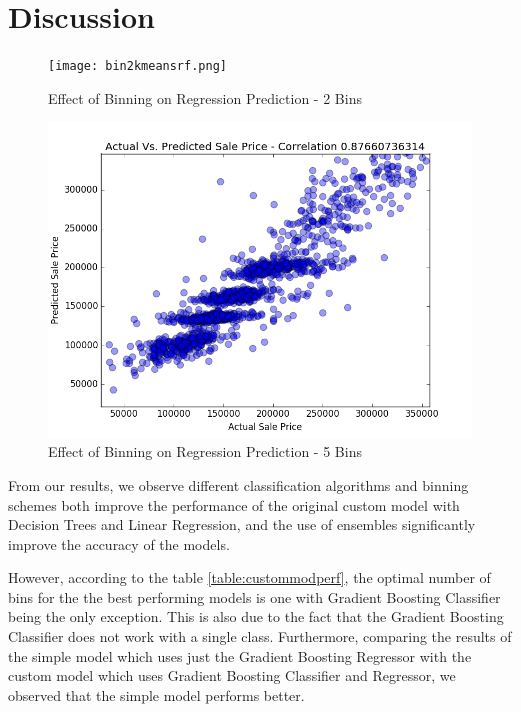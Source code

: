 \documentclass[conference,compsoc]{IEEEtran}
\begin{document}
\section {Discussion}
\begin{figure}[!h]
  \texttt{[image: bin2kmeansrf.png]}
  \caption{Effect of Binning on Regression Prediction - 2 Bins}
  \label{fig:binningeffect}
\end{figure}

\begin{figure}[!h]
  \includegraphics[width=\linewidth,natwidth=800,natheight=597]{Stairecase.png}
  \caption{Effect of Binning on Regression Prediction - 5 Bins}
  \label{fig:binningeffect2}
\end{figure}


\par
From our results, we observe different classification algorithms and binning schemes both improve the performance of the original custom model with Decision Trees and Linear Regression, and the use of ensembles significantly improve the accuracy of the models. 

\par
However, according to the table \ref{table:custommodperf}, the optimal number of bins for the the best performing models is one with Gradient Boosting Classifier being the only exception. This is also due to the fact that the Gradient Boosting Classifier does not work with a single class. Furthermore, comparing the results of the simple model which uses just the Gradient Boosting Regressor with the custom model which uses Gradient Boosting Classifier and Regressor, we observed that the simple model performs better.%
\end{document}
